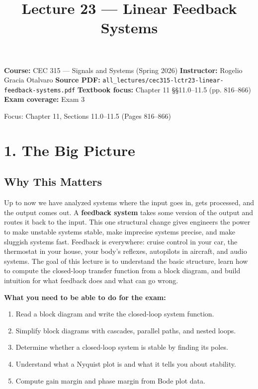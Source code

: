 \documentclass[11pt]{article}
\title{Lecture 23 — Linear Feedback Systems}
\author{}
\date{}
\begin{document}
\maketitle

\textbf{Course:} CEC 315 — Signals and Systems (Spring 2026)
\textbf{Instructor:} Rogelio Gracia Otalvaro
\textbf{Source PDF:} \texttt{all\_lectures/cec315-lctr23-linear-feedback-systems.pdf}
\textbf{Textbook focus:} Chapter 11 \S\S11.0–11.5 (pp. 816–866)
\textbf{Exam coverage:} Exam 3

Focus: Chapter 11, Sections 11.0–11.5 (Pages 816–866)

\section*{1. The Big Picture}

\subsection*{Why This Matters}

Up to now we have analyzed systems where the input goes in, gets processed, and the output comes out. A \textbf{feedback system} takes some version of the output and routes it back to the input. This one structural change gives engineers the power to make unstable systems stable, make imprecise systems precise, and make sluggish systems fast. Feedback is everywhere: cruise control in your car, the thermostat in your house, your body's reflexes, autopilots in aircraft, and audio systems. The goal of this lecture is to understand the basic structure, learn how to compute the closed-loop transfer function from a block diagram, and build intuition for what feedback does and what can go wrong.

\textbf{What you need to be able to do for the exam:}
\begin{enumerate}
  \item Read a block diagram and write the closed-loop system function.
  \item Simplify block diagrams with cascades, parallel paths, and nested loops.
  \item Determine whether a closed-loop system is stable by finding its poles.
  \item Understand what a Nyquist plot is and what it tells you about stability.
  \item Compute gain margin and phase margin from Bode plot data.
\end{enumerate}
\end{document}
